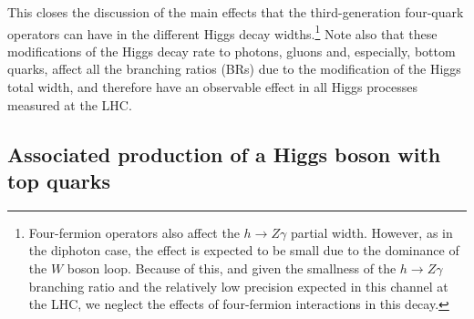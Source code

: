 This closes the discussion of the main effects that the third-generation four-quark operators can have in the different Higgs decay widths.\footnote{Four-fermion operators also affect the $h\to Z\gamma$ partial width. However, as in the diphoton case, the effect is expected to be small due to the dominance of the $W$ boson loop. Because of this, and given the smallness of the $h\to Z\gamma$ branching ratio and the relatively low precision expected in this channel at the LHC, we neglect the effects of four-fermion interactions in this decay.} Note also that these modifications of the Higgs decay rate to photons, gluons and, especially, bottom quarks, affect all the branching ratios (BRs) due to the modification of the Higgs total width, and therefore have an observable effect in all Higgs processes measured at the LHC.


\subsection{Associated production of a Higgs boson with top quarks}

